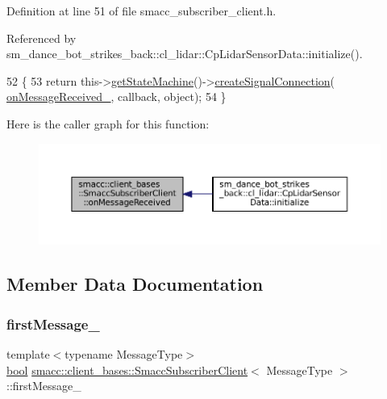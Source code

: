Definition at line 51 of file smacc\+\_\+subscriber\+\_\+client.\+h.



Referenced by sm\+\_\+dance\+\_\+bot\+\_\+strikes\+\_\+back\+::cl\+\_\+lidar\+::\+Cp\+Lidar\+Sensor\+Data\+::initialize().


\begin{DoxyCode}
52   \{
53     \textcolor{keywordflow}{return} this->\hyperlink{classsmacc_1_1ISmaccClient_aec51d4712404cb9882b86e4c854bb93a}{getStateMachine}()->\hyperlink{classsmacc_1_1ISmaccStateMachine_adf0f42ade0c65cc471960fe2a7c42da2}{createSignalConnection}(
      \hyperlink{classsmacc_1_1client__bases_1_1SmaccSubscriberClient_a04469577ec95e2f6c04cd4dca87dfc08}{onMessageReceived\_}, callback, \textcolor{keywordtype}{object});
54   \}
\end{DoxyCode}
Here is the caller graph for this function\+:
\nopagebreak
\begin{figure}[H]
\begin{center}
\leavevmode
\includegraphics[width=350pt]{classsmacc_1_1client__bases_1_1SmaccSubscriberClient_a4f02251e3a161fb6d802b154b1081f18_icgraph}
\end{center}
\end{figure}


\subsection{Member Data Documentation}
\mbox{\label{classsmacc_1_1client__bases_1_1SmaccSubscriberClient_a1283e89a0d33a9028a5042519c6869a6}} 
\subsubsection{\texorpdfstring{first\+Message\+\_\+}{firstMessage\_}}
{\footnotesize\ttfamily template$<$typename Message\+Type$>$ \\
\hyperlink{classbool}{bool} \hyperlink{classsmacc_1_1client__bases_1_1SmaccSubscriberClient}{smacc\+::client\+\_\+bases\+::\+Smacc\+Subscriber\+Client}$<$ Message\+Type $>$\+::first\+Message\+\_\+\hspace{0.3cm}{\ttfamily [private]}}




